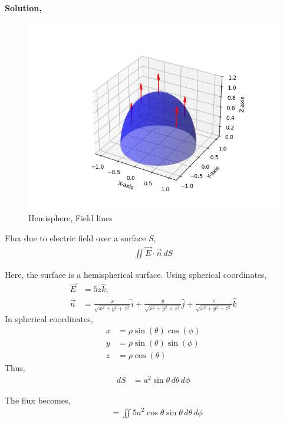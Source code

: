 \documentclass{article}
\begin{document}
\textbf{Solution,}\newline
\begin{figure}[h!]
   \centering
   \includegraphics[width=1\columnwidth]{figs/q3.png}
    \caption{Hemisphere, Field lines}
   \label{label}
\end{figure}

Flux due to electric field over a surface $S$,
\begin{align*}
\iint \vec{E} \cdot \vec{n} \, dS
\end{align*}

Here, the surface is a hemispherical surface. Using spherical coordinates,
\begin{align*}
\vec{E} &= 5z \hat{k}, \\
\vec{n} &= \frac{x}{\sqrt{x^2 + y^2 + z^2}} \hat{i} + \frac{y}{\sqrt{x^2 + y^2 + z^2}} \hat{j} + \frac{z}{\sqrt{x^2 + y^2 + z^2}} \hat{k}
\end{align*}
In spherical coordinates,
\begin{align*}
    x &= \rho \sin(\theta)  \cos(\phi)\\
    y &= \rho \sin(\theta)  \sin(\phi)\\
    z &= \rho \cos(\theta)
\end{align*}
Thus,
\begin{align*}
dS &= a^2 \sin{\theta} \, d\theta \, d\phi
\end{align*}

The flux becomes,
\begin{align*}
&= \iint 5a^2 \cos{\theta} \sin{\theta} \, d\theta \, d\phi
\end{align*}
\end{document}
